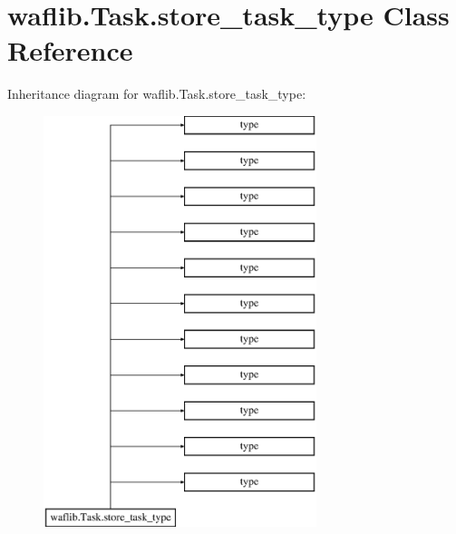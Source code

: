 \hypertarget{classwaflib_1_1_task_1_1store__task__type}{}\section{waflib.\+Task.\+store\+\_\+task\+\_\+type Class Reference}
\label{classwaflib_1_1_task_1_1store__task__type}
Inheritance diagram for waflib.\+Task.\+store\+\_\+task\+\_\+type\+:\begin{figure}[H]
\begin{center}
\leavevmode
\includegraphics[height=12.000000cm]{classwaflib_1_1_task_1_1store__task__type}
\end{center}
\end{figure}
